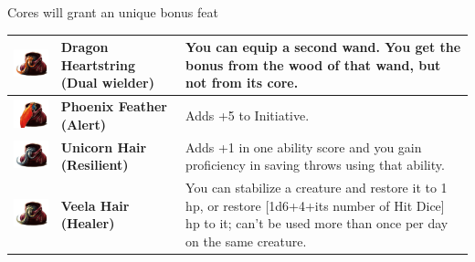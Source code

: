 Cores will grant an unique bonus feat \\

\begin{tabular}{ m{4cm}m{3cm}m{6cm} } \hline
	\includegraphics[width=4cm]{../Pictures/Gameplay/Items/Wearables/Wand/Cores/Dragon_heartstring_icon.png} & \textbf{Dragon Heartstring (Dual wielder)} & You can equip a second wand. You get the bonus from the wood of that wand, but not from its core. \\ \hline
	\includegraphics[width=4cm]{../Pictures/Gameplay/Items/Wearables/Wand/Cores/Phoenix_feather_icon.png} & \textbf{Phoenix Feather (Alert)} & Adds +5 to Initiative. \\ \hline
	\includegraphics[width=4cm]{../Pictures/Gameplay/Items/Wearables/Wand/Cores/Unicorn_hair_icon.png} & \textbf{Unicorn Hair (Resilient)} & Adds +1 in one ability score and you gain proficiency in saving throws using that ability.  \\ \hline
	\includegraphics[width=4cm]{../Pictures/Gameplay/Items/Wearables/Wand/Cores/Veela_hair_icon.png} & \textbf{Veela Hair (Healer)} & You can stabilize a creature and restore it to 1 hp, or restore [1d6+4+its number of Hit Dice] hp to it; can't be used more than once per day on the same creature. \\ \hline

\end{tabular}
